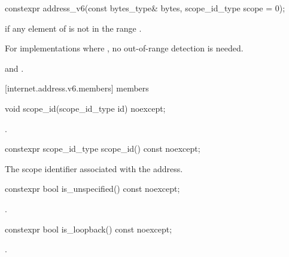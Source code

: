 \begin{itemdecl}
constexpr address_v6(const bytes_type& bytes,
                     scope_id_type scope = 0);
\end{itemdecl}

\begin{itemdescr}
\pnum
\remarks {} if any element of  is not in the range . \begin{note} For implementations where , no out-of-range detection is needed. \end{note}

\pnum
\postconditions {} and .
\end{itemdescr}



[internet.address.v6.members]{ members}

%
\begin{itemdecl}
void scope_id(scope_id_type id) noexcept;
\end{itemdecl}

\begin{itemdescr}
\pnum
\postconditions {}.
\end{itemdescr}

\begin{itemdecl}
constexpr scope_id_type scope_id() const noexcept;
\end{itemdecl}

\begin{itemdescr}
\pnum
\returns The scope identifier associated with the address.
\end{itemdescr}

%
\begin{itemdecl}
constexpr bool is_unspecified() const noexcept;
\end{itemdecl}

\begin{itemdescr}
\pnum
\returns {}.
\end{itemdescr}

%
\begin{itemdecl}
constexpr bool is_loopback() const noexcept;
\end{itemdecl}

\begin{itemdescr}
\pnum
\returns {}.
\end{itemdescr}

